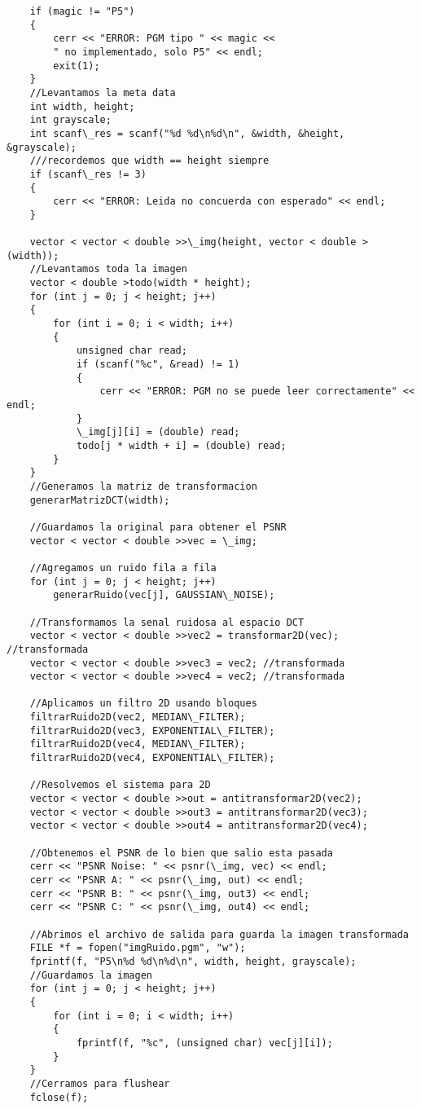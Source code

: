 \begin{lstlisting}
    if (magic != "P5")
    {
        cerr << "ERROR: PGM tipo " << magic <<
        " no implementado, solo P5" << endl;
        exit(1);
    }
    //Levantamos la meta data
    int width, height;
    int grayscale;
    int scanf\_res = scanf("%d %d\n%d\n", &width, &height, &grayscale);
    ///recordemos que width == height siempre
    if (scanf\_res != 3)
    {
        cerr << "ERROR: Leida no concuerda con esperado" << endl;
    }

    vector < vector < double >>\_img(height, vector < double >(width));
    //Levantamos toda la imagen
    vector < double >todo(width * height);
    for (int j = 0; j < height; j++)
    {
        for (int i = 0; i < width; i++)
        {
            unsigned char read;
            if (scanf("%c", &read) != 1)
            {
                cerr << "ERROR: PGM no se puede leer correctamente" << endl;
            }
            \_img[j][i] = (double) read;
            todo[j * width + i] = (double) read;
        }
    }
    //Generamos la matriz de transformacion
    generarMatrizDCT(width);

    //Guardamos la original para obtener el PSNR
    vector < vector < double >>vec = \_img;

    //Agregamos un ruido fila a fila
    for (int j = 0; j < height; j++)
        generarRuido(vec[j], GAUSSIAN\_NOISE);

    //Transformamos la senal ruidosa al espacio DCT
    vector < vector < double >>vec2 = transformar2D(vec);	//transformada
    vector < vector < double >>vec3 = vec2;	//transformada
    vector < vector < double >>vec4 = vec2;	//transformada

    //Aplicamos un filtro 2D usando bloques
    filtrarRuido2D(vec2, MEDIAN\_FILTER);
    filtrarRuido2D(vec3, EXPONENTIAL\_FILTER);
    filtrarRuido2D(vec4, MEDIAN\_FILTER);
    filtrarRuido2D(vec4, EXPONENTIAL\_FILTER);

    //Resolvemos el sistema para 2D
    vector < vector < double >>out = antitransformar2D(vec2);
    vector < vector < double >>out3 = antitransformar2D(vec3);
    vector < vector < double >>out4 = antitransformar2D(vec4);

    //Obtenemos el PSNR de lo bien que salio esta pasada
    cerr << "PSNR Noise: " << psnr(\_img, vec) << endl;
    cerr << "PSNR A: " << psnr(\_img, out) << endl;
    cerr << "PSNR B: " << psnr(\_img, out3) << endl;
    cerr << "PSNR C: " << psnr(\_img, out4) << endl;

    //Abrimos el archivo de salida para guarda la imagen transformada
    FILE *f = fopen("imgRuido.pgm", "w");
    fprintf(f, "P5\n%d %d\n%d\n", width, height, grayscale);
    //Guardamos la imagen
    for (int j = 0; j < height; j++)
    {
        for (int i = 0; i < width; i++)
        {
            fprintf(f, "%c", (unsigned char) vec[j][i]);
        }
    }
    //Cerramos para flushear
    fclose(f);


\end{lstlisting}
